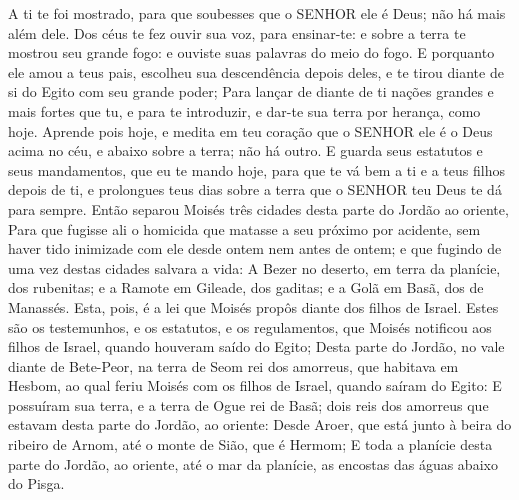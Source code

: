 {{  A ti te foi mostrado, para que soubesses que o SENHOR ele é Deus; não há mais além dele.
  Dos céus te fez ouvir sua voz, para ensinar-te: e sobre a terra te mostrou seu grande fogo: e ouviste suas palavras do meio do fogo.
  E porquanto ele amou a teus pais, escolheu sua descendência depois deles, e te tirou diante de si do Egito com seu grande poder;
  Para lançar de diante de ti nações grandes e mais fortes que tu, e para te introduzir, e dar-te sua terra por herança, como hoje.
  Aprende pois hoje, e medita em teu coração que o SENHOR ele é o Deus acima no céu, e abaixo sobre a terra; não há outro.
  E guarda seus estatutos e seus mandamentos, que eu te mando hoje, para que te vá bem a ti e a teus filhos depois de ti, e prolongues teus dias sobre a terra que o SENHOR teu Deus te dá para sempre}.
  Então separou Moisés três cidades desta parte do Jordão ao oriente,
  Para que fugisse ali o homicida que matasse a seu próximo por acidente, sem haver tido inimizade com ele desde ontem nem antes de ontem; e que fugindo de uma vez destas cidades salvara a vida:
  A Bezer no deserto, em terra da planície, dos rubenitas; e a Ramote em Gileade, dos gaditas; e a Golã em Basã, dos de Manassés.
  Esta, pois, é a lei que Moisés propôs diante dos filhos de Israel.
  Estes são os testemunhos, e os estatutos, e os regulamentos, que Moisés notificou aos filhos de Israel, quando houveram saído do Egito;
  Desta parte do Jordão, no vale diante de Bete-Peor, na terra de Seom rei dos amorreus, que habitava em Hesbom, ao qual feriu Moisés com os filhos de Israel, quando saíram do Egito:
  E possuíram sua terra, e a terra de Ogue rei de Basã; dois reis dos amorreus que estavam desta parte do Jordão, ao oriente:
  Desde Aroer, que está junto à beira do ribeiro de Arnom, até o monte de Sião, que é Hermom;
  E toda a planície desta parte do Jordão, ao oriente, até o mar da planície, as encostas das águas abaixo do Pisga.
\par }

